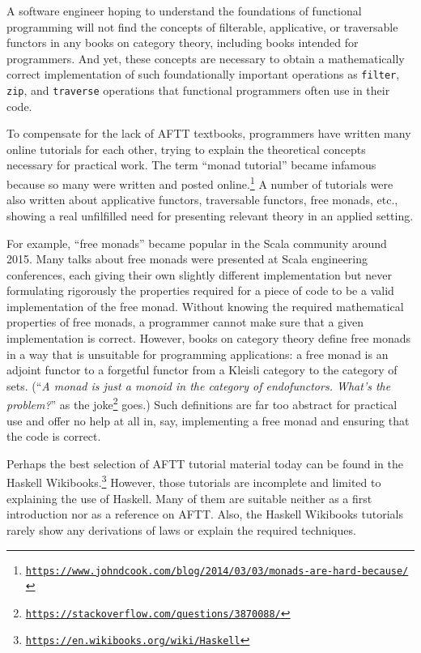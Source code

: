 A software engineer hoping to understand the foundations of functional
programming will not find the concepts of filterable, applicative,
or traversable functors in any books on category theory, including
books intended for programmers. And yet, these concepts are necessary
to obtain a mathematically correct implementation of such foundationally
important operations as \lstinline!filter!, \lstinline!zip!, and
\lstinline!traverse! \textemdash{} operations that functional programmers
often use in their code.

To compensate for the lack of AFTT textbooks, programmers have written
many online tutorials for each other, trying to explain the theoretical
concepts necessary for practical work. The term ``monad tutorial''
became infamous because so many were written and posted online.\footnote{\texttt{\href{https://www.johndcook.com/blog/2014/03/03/monads-are-hard-because/}{https://www.johndcook.com/blog/2014/03/03/monads-are-hard-because/}}}
A number of tutorials were also written about applicative functors,
traversable functors, free monads, etc., showing a real unfilfilled
need for presenting relevant theory in an applied setting. 

For example, ``free monads'' became popular in the Scala community
around 2015. Many talks about free monads were presented at Scala
engineering conferences, each giving their own slightly different
implementation but never formulating rigorously the properties required
for a piece of code to be a valid implementation of the free monad.
Without knowing the required mathematical properties of free monads,
a programmer cannot make sure that a given implementation is correct.
However, books on category theory define free monads in a way that
is unsuitable for programming applications: a free monad is an adjoint
functor to a forgetful functor from a Kleisli category to the category
of sets. (``\emph{A monad is just a monoid in the category of endofunctors.
What's the problem?}'' as the joke\footnote{\texttt{\href{https://stackoverflow.com/questions/3870088/}{https://stackoverflow.com/questions/3870088/}}}
goes.) Such definitions are far too abstract for practical use and
offer no help at all in, say, implementing a free monad and ensuring
that the code is correct.

Perhaps the best selection of AFTT tutorial material today can be
found in the Haskell Wikibooks.\footnote{\texttt{\href{https://en.wikibooks.org/wiki/Haskell}{https://en.wikibooks.org/wiki/Haskell}}}
However, those tutorials are incomplete and limited to explaining
the use of Haskell. Many of them are suitable neither as a first introduction
nor as a reference on AFTT. Also, the Haskell Wikibooks tutorials
rarely show any derivations of laws or explain the required techniques.

